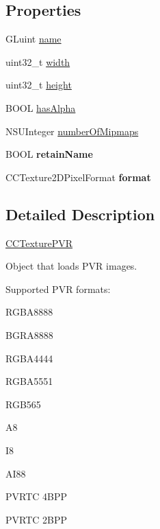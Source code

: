 \subsection*{Properties}
\begin{DoxyCompactItemize}
\item 
G\-Luint \hyperlink{interface_c_c_texture_p_v_r_ac3b91de15322c3eabf041316595287bf}{name}
\item 
uint32\-\_\-t \hyperlink{interface_c_c_texture_p_v_r_a6888f6b09a2bfdc4b2017fa440e6efe2}{width}
\item 
uint32\-\_\-t \hyperlink{interface_c_c_texture_p_v_r_ac2bec2560bd2449e7d23d7ef843e37dc}{height}
\item 
B\-O\-O\-L \hyperlink{interface_c_c_texture_p_v_r_ae72c73a2de4c7c8db4484164a5e7c1ff}{has\-Alpha}
\item 
N\-S\-U\-Integer \hyperlink{interface_c_c_texture_p_v_r_ae6f06946b28736a3185a4b7a2bbbe92a}{number\-Of\-Mipmaps}
\item 
\hypertarget{interface_c_c_texture_p_v_r_ab810e8f17eac7fd8554f6e2713edf396}{B\-O\-O\-L {\bfseries retain\-Name}}\label{interface_c_c_texture_p_v_r_ab810e8f17eac7fd8554f6e2713edf396}

\item 
\hypertarget{interface_c_c_texture_p_v_r_a4588d5abe28978a09fe9242ba2e9da20}{C\-C\-Texture2\-D\-Pixel\-Format {\bfseries format}}\label{interface_c_c_texture_p_v_r_a4588d5abe28978a09fe9242ba2e9da20}

\end{DoxyCompactItemize}


\subsection{Detailed Description}
\hyperlink{interface_c_c_texture_p_v_r}{C\-C\-Texture\-P\-V\-R}

Object that loads P\-V\-R images.

Supported P\-V\-R formats\-:
\begin{DoxyItemize}
\item R\-G\-B\-A8888
\item B\-G\-R\-A8888
\item R\-G\-B\-A4444
\item R\-G\-B\-A5551
\item R\-G\-B565
\item A8
\item I8
\item A\-I88
\item P\-V\-R\-T\-C 4\-B\-P\-P
\item P\-V\-R\-T\-C 2\-B\-P\-P
\end{DoxyItemize}

